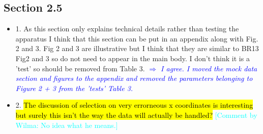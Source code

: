 \documentclass[10pt,a4paper]{article}
\newcommand{\HW}[1]{\textcolor{Cyan}{#1}}
\newcommand{\Comment}[1]{\textsl{\textcolor{Blue}{$\Longrightarrow$ {#1}}}}
\begin{document}
\subsection{Section 2.5}
\begin{itemize}
\item 1. As this section only explains technical details rather than testing the apparatus I think that this section can be put in an appendix along with Fig. 2 and 3. Fig 2 and 3 are illustrative but I think that they are similar to BR13 Fig2 and 3 so do not need to appear in the main body. I don't think it is a 'test' so should be removed from Table 3. \Comment{I agree. I moved the mock data section and figures to the appendix and removed the parameters belonging to Figure 2 + 3 from the 'tests' Table 3.}
\item 2. \hl{The discussion of selection on very errorneous x coordinates is interesting but surely this isn't the way the data will actually be handled?} \HW{[Comment by Wilma: No idea what he means.]}
\end{itemize}
\end{document}
